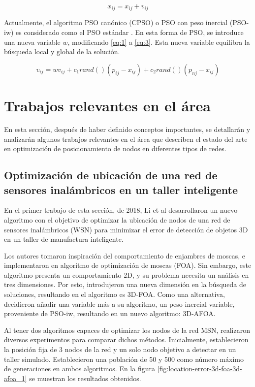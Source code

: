 \documentclass[letterpaper]{report}
\begin{document}
    \begin{equation}
      \label{eq:2}
      x_{ij} = x_{ij} + v_{ij}
    \end{equation}

    Actualmente, el algoritmo PSO canónico (CPSO) o PSO con peso inercial
    (PSO-iw) es considerado como el PSO estándar \cite{CPSO,PSOReview}.
    En esta forma de PSO, se introduce una nueva variable $w$, modificando
    \ref{eq:1} a \ref{eq:3}. Esta nueva variable equilibra la búsqueda local y
    global de la solución.

    \begin{equation}
      \label{eq:3}
      v_{ij} = w v_{ij} + c_1 rand()(p_{ij} - x_{ij}) + c_2 rand()(p_{nj} - x_{ij})
    \end{equation}

\section{Trabajos relevantes en el área}
  En esta sección, después de haber definido conceptos importantes, se
  detallarán y analizarán algunos trabajos relevantes en el área que describen
  el estado del arte en optimización de posicionamiento de nodos en diferentes
  tipos de redes.

  \subsection{Optimización de ubicación de una red de sensores inalámbricos en
    un taller inteligente}
    En el primer trabajo de esta sección, de 2018, Li et al \cite{3DAFAO}
    desarrollaron un nuevo algoritmo con el
    objetivo de optimizar la ubicación de nodos de una red de sensores
    inalámbricos (WSN) para minimizar el error de detección de objetos 3D en un
    taller de manufactura inteligente.
    
    Los autores tomaron inspiración del comportamiento de enjambres de moscas,
    e implementaron en algoritmo de 
    optimización de moscas (FOA). Sin embargo, este algoritmo presenta un
    comportamiento 2D, y su problema necesita un análisis en tres dimensiones.
    Por esto, introdujeron una nueva dimensión en la búsqueda de soluciones,
    resultando en el algoritmo es 3D-FOA. Como una alternativa, decidieron
    añadir una variable más a su algoritmo, un peso inercial variable,
    proveniente de PSO-iw, resultando en un nuevo algoritmo: 3D-AFOA.

    Al tener dos algoritmos capaces de optimizar los nodos de la red MSN,
    realizaron diversos experimentos para comparar dichos métodos. Inicialmente,
    establecieron la posición fija de 3 nodos de la red y un solo nodo objetivo
    a detectar en un taller simulado. Establecieron una población de 50 y 500
    como número máximo de generaciones en ambos algoritmos. En la figura
    \ref{fig:location-error-3d-foa-3d-afoa_1} se muestran los resultados
    obtenidos.
\end{document}

